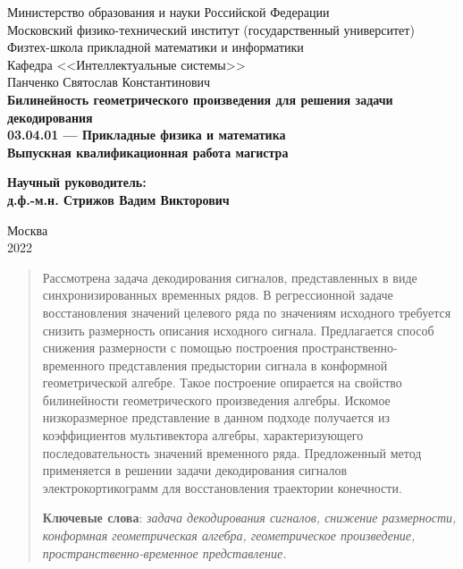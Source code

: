 \documentclass[12pt]{article}
\begin{document}
\thispagestyle{empty}
\begin{center}
    \sc
        Министерство образования и науки Российской Федерации\\
        Московский физико-технический институт
        {\rm(государственный университет)}\\
        Физтех-школа прикладной математики и информатики\\
        Кафедра <<Интеллектуальные системы>>\\[35mm]
    \rm\large
        Панченко Святослав Константинович\\[10mm]
    \bf\Large
		Билинейность геометрического произведения для решения задачи декодирования \\[10mm]
    \rm\normalsize
        03.04.01 --- Прикладные физика и математика\\[10mm]
    \sc
        Выпускная квалификационная работа магистра\\[10mm]
\end{center}
\hfill\parbox{80mm}{
    \begin{flushleft}
    \bf
        Научный руководитель:\\
    \rm
        д.ф.-м.н. Стрижов Вадим Викторович\\[5cm]
    \end{flushleft}
}
\begin{center}
    Москва\\
    2022
\end{center}


\newpage
\tableofcontents
\newpage


\begin{abstract}
    Рассмотрена задача декодирования сигналов, представленных в виде синхронизированных временных рядов. В регрессионной задаче восстановления значений целевого ряда по значениям исходного требуется снизить размерность описания исходного сигнала. Предлагается способ снижения размерности с помощью построения пространственно-временного представления предыстории сигнала в конформной геометрической алгебре. Такое построение опирается на свойство билинейности геометрического произведения алгебры. Искомое низкоразмерное представление в данном подходе получается из коэффициентов мультивектора алгебры, характеризующего последовательность значений временного ряда. Предложенный метод применяется в решении задачи декодирования сигналов электрокортикограмм для восстановления траектории конечности.
    
  \bigskip
  \textbf{Ключевые слова}: \emph{задача декодирования сигналов, снижение размерности, конформная геометрическая алгебра, геометрическое произведение, пространственно-временное представление.}
\end{abstract}
\end{document}
